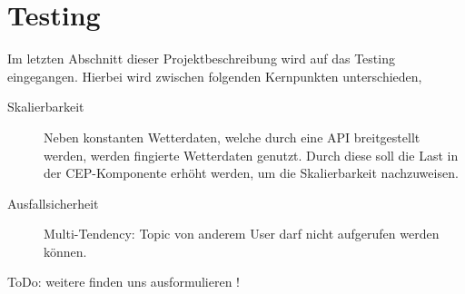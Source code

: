 \documentclass[paper,oneside,onecolumn,notitlepage,bibtotocnumbered,fontsize=12pt,bigheadings,ngerman]{scrartcl}
\begin{document}
\section{Testing}

Im letzten Abschnitt dieser Projektbeschreibung wird auf das Testing eingegangen. Hierbei wird zwischen folgenden Kernpunkten unterschieden,
\begin{description}
\item [Skalierbarkeit] Neben konstanten Wetterdaten, welche durch eine API breitgestellt werden, werden fingierte Wetterdaten genutzt. Durch diese soll die Last in der CEP-Komponente erhöht werden, um die Skalierbarkeit nachzuweisen. 
\item [Ausfallsicherheit] Multi-Tendency: Topic von anderem User darf nicht aufgerufen werden können.
\item[ToDo: weitere finden uns ausformulieren !]

\end{description}
\end{document}
